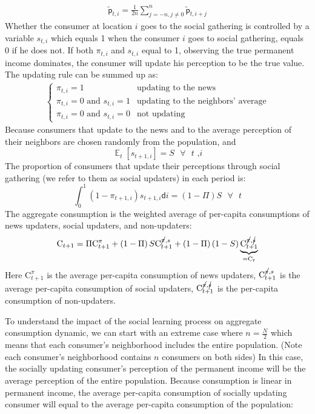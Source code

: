 \documentclass[12pt,letterpaper]{article}
\DeclareMathOperator{\E}{\mathbb{E}}
\begin{document}
\begin{eqnarray} \label{Toy:SocialUpdating}
\tilde{\mathsf{p}}_{t,i}=\frac{1}{2n}\sum\limits_{j=-n,j\neq 0}^n \tilde{\mathsf{p}}_{t,i+j}
\end{eqnarray}
Whether the consumer at location $i$ goes to the social gathering is controlled by a variable $s_{t,i}$ which equals 1 when the consumer $i$ goes to social gathering, equals 0 if he does not. If both $\pi_{t,i}$ and $s_{t,i}$ equal to 1, observing the true permanent income dominates, the consumer will update his perception to be the true value. The updating rule can be summed up as:
\begin{eqnarray}
\begin{cases}
\pi_{t,i}=1  & \text{updating to the news}\\
\pi_{t,i}=0\text{ and }s_{t,i}=1 & \text{updating to the neighbors' average}\\
\pi_{t,i}=0\text{ and }s_{t,i}=0 & \text{not updating}
\end{cases}
\end{eqnarray}
Because consumers that update to the news and to the average perception of their neighbors are chosen randomly from the population, and
\begin{equation}
\E_{t}\left[s_{t+1,i}\right]=S\text{  }\forall\text{  }t\text{ ,}i
\end{equation}
The proportion of consumers that update their perceptions through social gathering (we refer to them as social updaters) in each period is:
\begin{equation}
\int_{0}^{1}(1-\pi_{t+1,i})s_{t+1,i}\mathsf{d}i=(1-\Pi)S\text{  }\forall\text{  }t
\end{equation}
The aggregate consumption is the weighted average of per-capita consumptions of news updaters, social updaters, and non-updaters:
\begin{equation} \label{Toy:Social}
\mathrm{C}_{t+1}=\Pi\mathrm{C}^{\pi}_{t+1}+\left(1-\Pi\right)S\mathrm{C}_{t+1}^{\cancel{\pi},s}+\left(1-\Pi\right)\left(1-S\right)\underbrace{\mathrm{C}^{\cancel{\pi},\cancel{s}}_{t+1}}_{=\mathrm{C}_{t}}
\end{equation}
Here $\mathrm{C}^{\pi}_{t+1}$ is the average per-capita consumption of news updaters, $\mathrm{C}_{t+1}^{\cancel{\pi},s}$ is the average per-capita consumption of social updaters, $\mathrm{C}^{\cancel{\pi},\cancel{s}}_{t+1}$ is the per-capita consumption of non-updaters.
\par
To understand the impact of the social learning process on aggregate consumption dynamic, we can start with an extreme case where $n=\frac{N}{2}$ which means that each consumer's neighborhood includes the entire population. (Note each consumer's neighborhood contains $n$ consumers on both sides) In this case, the socially updating consumer's perception of the permanent income will be the average perception of the entire population. Because consumption is linear in permanent income, the average per-capita consumption of socially updating consumer will equal to the average per-capita consumption of the population:
\end{document}
